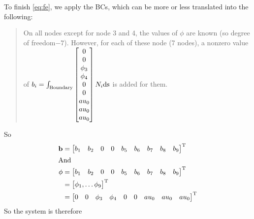 To finish \cref{eq:fe}, we apply the BCs, which can be more or less translated
into the following:
\def\DOF{degree of freedom}
\begin{quote}
  On all nodes except for node 3 and 4,
  the values of $\phi$ are known (so  \DOF{}$-7$). However, for each of these
  node (7 nodes), a nonzero value of $b_i = \bi$ is added for them.
\end{quote}
So
\def\au{\ensuremath{au_0}}
\begin{align}
  \mathbf{b} &=
               \tr{\begin{bmatrix}
                 b_1 & b_2 & 0&0&b_5&b_6&b_7&b_8&b_9
               \end{bmatrix}}
                                                  \notag\\
  \intertext{And}
  \mathbf{\phi}
             &=
                  \tr{\begin{bmatrix}
                      b_1 & b_2 & 0&0&b_5&b_6&b_7&b_8&b_9
                    \end{bmatrix}} \notag\\
             &=
               \tr{\begin{bmatrix}
                   \phi_1 , \dotsc \phi_9
                 \end{bmatrix}} \notag\\
             &=
               \tr{\begin{bmatrix}
                   0&0&\phi_3&\phi_4&0&0&\au&\au&\au
                 \end{bmatrix}}
\end{align}
So the system is therefore
\def\bn{\ensuremath{
    \begin{bmatrix}
      b_1 \\ b_2 \\ 0 \\ 0 \\ b_5 \\ b_6 \\ b_7 \\ b_8 \\ b_9 
    \end{bmatrix}}}
\def\phin{\ensuremath{
    \begin{bmatrix}
      0\\0\\\phi_3\\\phi_4\\0\\0\\ \au \\ \au \\ \au
    \end{bmatrix}}}
